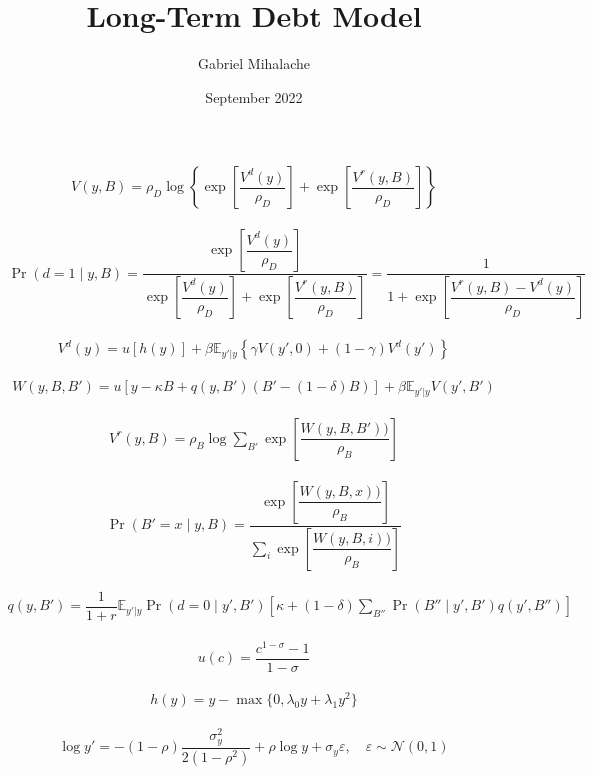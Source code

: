 \documentclass[10pt]{article}
\title{Long-Term Debt Model}
\author{Gabriel Mihalache}
\date{September 2022}
\newcommand{\E}{\mathbb{E}}
\begin{document}

\begin{align}
V\left(y, B\right) = \rho_D \log \left\{ \exp\left[ \dfrac{V^d(y)}{\rho_D} \right] +
\exp \left[ \dfrac{V^r(y, B)}{\rho_D} \right] \right\}
\end{align}

\begin{align}
\Pr\left(d = 1 \middle| y, B\right) = \dfrac{
  \exp\left[ \dfrac{V^d(y)}{\rho_D} \right]
}{\exp\left[ \dfrac{V^d(y)}{\rho_D} \right] +
\exp \left[ \dfrac{V^r(y, B)}{\rho_D} \right]}
= \dfrac{1}{1 + \exp \left[ \dfrac{V^r(y, B) - V^d(y)}{\rho_D} \right]}
\end{align}

\begin{align}
V^d\left(y\right) = u\left[h\left(y\right)\right] + \beta \E_{y'|y} \left\{ \gamma V\left( y', 0 \right) +
(1-\gamma) V^d\left(y'\right) \right\}
\end{align}

\begin{align}
W\left(y, B, B'\right) = u\left[ y - \kappa B + q\left(y, B'\right) \left( B' - (1-\delta) B \right) \right] + \beta \E_{y'|y} V\left(y', B'\right)
\end{align}

\begin{align}
V^r\left(y, B\right) = \rho_B \log \sum_{B'} \exp \left[ \dfrac{W\left(y, B, B'\right))}{\rho_B} \right]
\end{align}

\begin{align}
\Pr\left(B' = x \middle| y, B \right) = \dfrac{
  \exp \left[ \dfrac{W\left(y, B, x\right))}{\rho_B} \right]
}{\sum_{i} \exp \left[ \dfrac{W\left(y, B, i\right))}{\rho_B} \right]}
\end{align}

\begin{align}
q\left(y, B'\right) = \dfrac{1}{1+r} \E_{y'|y} \Pr\left(d=0 \middle| y', B'\right)
\left[ \kappa + (1-\delta) \sum_{B''} \Pr\left( B'' \middle| y', B'\right) q\left(y', B''\right) \right]
\end{align}

\begin{align}
u\left(c\right) = \dfrac{c^{1-\sigma} - 1}{1-\sigma}
\end{align}

\begin{align}
h\left(y\right) = y - \max\{ 0, \lambda_0 y + \lambda_1 y^2 \}
\end{align}

\begin{align}
\log y' = - (1-\rho) \dfrac{\sigma_y^2}{2 \left( 1 - \rho^2\right)} + \rho \log y + \sigma_y \varepsilon, \quad \varepsilon \sim \mathcal{N}(0, 1)
\end{align}
\end{document}
